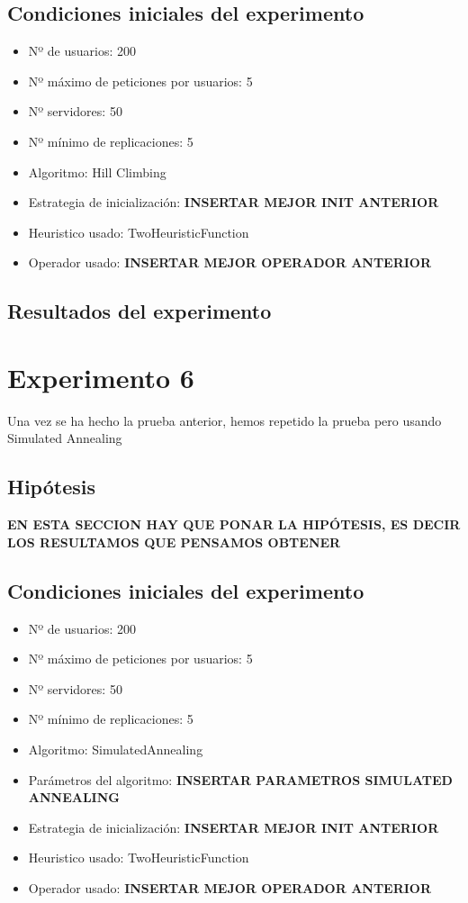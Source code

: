 \documentclass[a4paper,10pt]{report}
\begin{document}
		\section*{Condiciones iniciales del experimento}
		\begin{itemize}
		    \item Nº de usuarios: 200
    		\item Nº máximo de peticiones por usuarios: 5
    		\item Nº servidores: 50
    		\item Nº mínimo de replicaciones: 5
    		\item Algoritmo: Hill Climbing
    		\item Estrategia de inicialización: \textbf{INSERTAR MEJOR INIT ANTERIOR}
    		\item Heuristico usado: TwoHeuristicFunction
    		\item Operador usado:  \textbf{INSERTAR MEJOR OPERADOR ANTERIOR}
		\end{itemize}

		\section*{Resultados del experimento}
		
		
	\chapter*{Experimento 6}

		Una vez se ha hecho la prueba anterior, hemos repetido la prueba pero usando Simulated Annealing\newline

        \section*{Hipótesis}
		\textbf{EN ESTA SECCION HAY QUE PONAR LA HIPÓTESIS, ES DECIR LOS RESULTAMOS QUE PENSAMOS OBTENER}

		\section*{Condiciones iniciales del experimento}
		\begin{itemize}
		    \item Nº de usuarios: 200
    		\item Nº máximo de peticiones por usuarios: 5
    		\item Nº servidores: 50
    		\item Nº mínimo de replicaciones: 5
    		\item Algoritmo: SimulatedAnnealing
    		\item Parámetros del algoritmo: \textbf{INSERTAR PARAMETROS SIMULATED ANNEALING}
    		\item Estrategia de inicialización: \textbf{INSERTAR MEJOR INIT ANTERIOR}
    		\item Heuristico usado: TwoHeuristicFunction
    		\item Operador usado:  \textbf{INSERTAR MEJOR OPERADOR ANTERIOR}
		\end{itemize}
\end{document}
